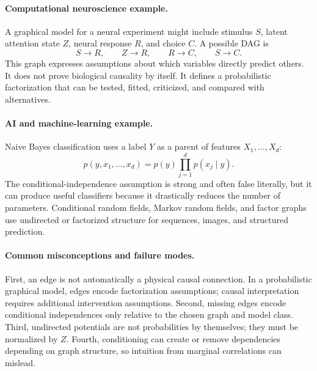 \paragraph{Computational neuroscience example.}
A graphical model for a neural experiment might include stimulus \(S\), latent attention state \(Z\), neural response \(R\), and choice \(C\). A possible DAG is
\[
S\to R,\qquad Z\to R,\qquad R\to C,\qquad S\to C.
\]
This graph expresses assumptions about which variables directly predict others. It does not prove biological causality by itself. It defines a probabilistic factorization that can be tested, fitted, criticized, and compared with alternatives.

\paragraph{AI and machine-learning example.}
Naive Bayes classification uses a label \(Y\) as a parent of features \(X_1,\ldots,X_d\):
\[
p(y,x_1,\ldots,x_d)=p(y)\prod_{j=1}^d p(x_j\mid y).
\]
The conditional-independence assumption is strong and often false literally, but it can produce useful classifiers because it drastically reduces the number of parameters. Conditional random fields, Markov random fields, and factor graphs use undirected or factorized structure for sequences, images, and structured prediction.

\paragraph{Common misconceptions and failure modes.}
First, an edge is not automatically a physical causal connection. In a probabilistic graphical model, edges encode factorization assumptions; causal interpretation requires additional intervention assumptions. Second, missing edges encode conditional independences only relative to the chosen graph and model class. Third, undirected potentials are not probabilities by themselves; they must be normalized by \(Z\). Fourth, conditioning can create or remove dependencies depending on graph structure, so intuition from marginal correlations can mislead.

